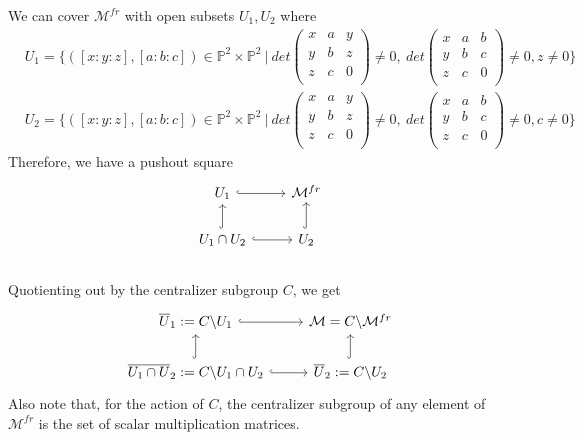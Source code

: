 \begin{example}
We can cover $\mathcal{M}^{fr}$ with open subsets $U_1,U_2$ where 
\begin{align*}
	&U_{1}=\{
	([x:y:z],[a:b:c])\in \mathbb{P}^2 \times \mathbb{P}^2~|~
	det	
	\begin{pmatrix}
	x&a&y\\
	y&b&z\\
	z&c&0\\
	\end{pmatrix}
	\neq 0,~
	det	
	\begin{pmatrix}
	x&a&b\\
	y&b&c\\
	z&c&0\\
	\end{pmatrix}
	\neq 0,
	z\neq 0	 	
	\}\\
	&U_{2}=
	\{
	([x:y:z],[a:b:c])\in \mathbb{P}^2 \times \mathbb{P}^2~|~
	det	
	\begin{pmatrix}
	x&a&y\\
	y&b&z\\
	z&c&0\\
	\end{pmatrix}
	\neq 0,~
	det	
	\begin{pmatrix}
	x&a&b\\
	y&b&c\\
	z&c&0\\
	\end{pmatrix}
	\neq 0,
	c\neq 0	 	
	\}	
\end{align*}
Therefore, we have a pushout square
\begin{displaymath}
\begin{tikzcd}
  U_1\arrow[hookrightarrow]{r} & \mathcal{M}^{fr} \\
  U_1 \cap U_2 \arrow[hookrightarrow]{u} \arrow[r,hookrightarrow] & U_2 \arrow[hookrightarrow]{u} 
\end{tikzcd} 
\end{displaymath}\\
Quotienting out by the centralizer subgroup $C$, we get
\begin{displaymath}
\begin{tikzcd}
  \overline{U}_1:=C\backslash U_1\arrow[r,hookrightarrow] & \mathcal{M}=C\backslash\mathcal{M}^{fr} \\
  \overline{U_1 \cap U}_2:=C\backslash U_1 \cap U_2 \arrow[hookrightarrow]{u} \arrow[r,hookrightarrow] & \overline{U}_2:=C\backslash U_2 \arrow[hookrightarrow]{u} 
\end{tikzcd} 
\end{displaymath}
Also note that, for the action of $C$, the centralizer subgroup of any element of $\mathcal{M}^{fr}$ is the set of scalar multiplication matrices.\\ 

\end{example}

